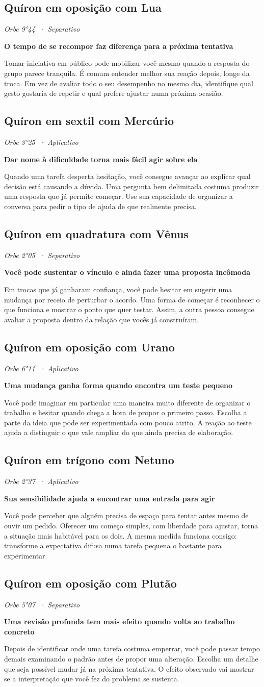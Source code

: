 \documentclass[11pt,a4paper]{article}
\newcommand{\leitura}[3]{\subsection{#1}\textit{#2}\par #3}
\newcommand{\subtituloleitura}[1]{\textbf{#1}\par\nopagebreak[4]}
\begin{document}
\leitura{Quíron em oposição com Lua}{Orbe 9°44\ensuremath{^{\prime}} · Separativo}{
\subtituloleitura{O tempo de se recompor faz diferença para a próxima tentativa}
Tomar iniciativa em público pode mobilizar você mesmo quando a resposta do grupo parece tranquila. É comum entender melhor sua reação depois, longe da troca. Em vez de avaliar todo o seu desempenho no mesmo dia, identifique qual gesto gostaria de repetir e qual prefere ajustar numa próxima ocasião.
}

\leitura{Quíron em sextil com Mercúrio}{Orbe 3°25\ensuremath{^{\prime}} · Aplicativo}{
\subtituloleitura{Dar nome à dificuldade torna mais fácil agir sobre ela}
Quando uma tarefa desperta hesitação, você consegue avançar ao explicar qual decisão está causando a dúvida. Uma pergunta bem delimitada costuma produzir uma resposta que já permite começar. Use sua capacidade de organizar a conversa para pedir o tipo de ajuda de que realmente precisa.
}

\leitura{Quíron em quadratura com Vênus}{Orbe 2°05\ensuremath{^{\prime}} · Separativo}{
\subtituloleitura{Você pode sustentar o vínculo e ainda fazer uma proposta incômoda}
Em trocas que já ganharam confiança, você pode hesitar em sugerir uma mudança por receio de perturbar o acordo. Uma forma de começar é reconhecer o que funciona e mostrar o ponto que quer testar. Assim, a outra pessoa consegue avaliar a proposta dentro da relação que vocês já construíram.
}

\leitura{Quíron em oposição com Urano}{Orbe 6°11\ensuremath{^{\prime}} · Aplicativo}{
\subtituloleitura{Uma mudança ganha forma quando encontra um teste pequeno}
Você pode imaginar em particular uma maneira muito diferente de organizar o trabalho e hesitar quando chega a hora de propor o primeiro passo. Escolha a parte da ideia que pode ser experimentada com pouco atrito. A reação ao teste ajuda a distinguir o que vale ampliar do que ainda precisa de elaboração.
}

\leitura{Quíron em trígono com Netuno}{Orbe 2°37\ensuremath{^{\prime}} · Aplicativo}{
\subtituloleitura{Sua sensibilidade ajuda a encontrar uma entrada para agir}
Você pode perceber que alguém precisa de espaço para tentar antes mesmo de ouvir um pedido. Oferecer um começo simples, com liberdade para ajustar, torna a situação mais habitável para os dois. A mesma medida funciona consigo: transforme a expectativa difusa numa tarefa pequena o bastante para experimentar.
}

\leitura{Quíron em oposição com Plutão}{Orbe 5°07\ensuremath{^{\prime}} · Separativo}{
\subtituloleitura{Uma revisão profunda tem mais efeito quando volta ao trabalho concreto}
Depois de identificar onde uma tarefa costuma emperrar, você pode passar tempo demais examinando o padrão antes de propor uma alteração. Escolha um detalhe que seja possível mudar já na próxima tentativa. O efeito observado vai mostrar se a interpretação que você fez do problema se sustenta.
}
\end{document}
